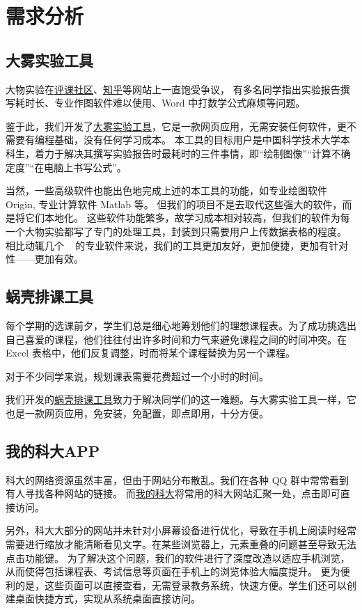 \section{需求分析}

\subsection{大雾实验工具}

大物实验在\href{https://icourse.club/course/12716/}{评课社区}、\href{https://www.zhihu.com/question/35867101}{知乎}等网站上一直饱受争议，
有多名同学指出实验报告撰写耗时长、专业作图软件难以使用、Word 中打数学公式麻烦等问题。

鉴于此，我们开发了\href{https://dawu.feixu.site/}{{大雾实验工具}}，它是一款网页应用，无需安装任何软件，更不需要有编程基础，没有任何学习成本。
本工具的目标用户是中国科学技术大学本科生，着力于解决其撰写实验报告时最耗时的三件事情，即“绘制图像”“计算不确定度”“在电脑上书写公式”。

当然，一些高级软件也能出色地完成上述的本工具的功能，如专业绘图软件 Origin, 专业计算软件 Matlab 等。
但我们的项目不是去取代这些强大的软件，而是将它们{本地化}。
这些软件功能繁多，故学习成本相对较高，但我们的软件为每一个大物实验都写了专门的处理工具，封装到只需要用户上传数据表格的程度。
相比动辄几个 \unit{\giga\byte} 的专业软件来说，我们的工具更加友好，更加便捷，更加有针对性——更加有效。

\subsection{蜗壳排课工具}

每个学期的选课前夕，学生们总是细心地筹划他们的理想课程表。为了成功挑选出自己喜爱的课程，他们往往付出许多时间和力气来避免课程之间的时间冲突。在 Excel 表格中，他们反复调整，时而将某个课程替换为另一个课程。

对于不少同学来说，规划课表需要花费超过一个小时的时间。

我们开发的\href{https://paike.feixu.site/}{{蜗壳排课工具}}致力于解决同学们的这一难题。与大雾实验工具一样，它也是一款网页应用，免安装，免配置，即点即用，十分方便。

\subsection{我的科大APP}

科大的网络资源虽然丰富，但由于网站分布散乱。我们在各种 QQ 群中常常看到有人寻找各种网站的链接。
而\href{https://myustc.feixu.site/}{{我的科大}}将常用的科大网站汇聚一处，点击即可直接访问。

另外，科大大部分的网站并未针对小屏幕设备进行优化，导致在手机上阅读时经常需要进行缩放才能清晰看见文字。在某些浏览器上，元素重叠的问题甚至导致无法点击功能键。
为了解决这个问题，我们的软件进行了深度改造以适应手机浏览，从而使得包括课程表、考试信息等页面在手机上的浏览体验大幅度提升。
更为便利的是，这些页面可以直接查看，无需登录教务系统，快速方便。学生们还可以创建桌面快捷方式，实现从系统桌面直接访问。